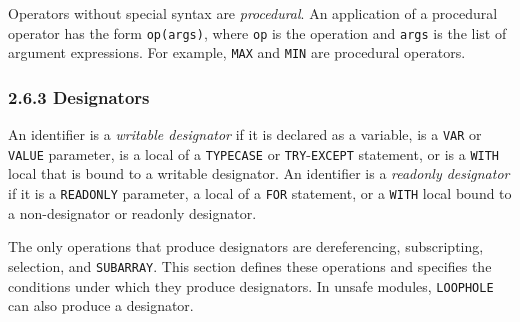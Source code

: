 \documentclass[10pt]{article}
\begin{document}
Operators without special syntax are \emph{procedural}.  An application of a
procedural operator has the form \verb|op(args)|, where \verb|op| is the
operation and \verb|args| is the list of argument expressions.  For example,
\verb|MAX| and \verb|MIN| are procedural operators.

\subsubsection*{2.6.3 Designators}

An identifier is a \emph{writable designator} if it is declared as a variable,
is a \verb|VAR| or \verb|VALUE| parameter, is a local of a \verb|TYPECASE| or
\verb|TRY|-\verb|EXCEPT| statement, or is a \verb|WITH| local that is bound to a
writable designator.  An identifier is a \emph{readonly designator} if it is a
\verb|READONLY| parameter, a local of a \verb|FOR| statement, or a \verb|WITH|
local bound to a non-designator or readonly designator.

The only operations that produce designators are dereferencing, subscripting,
selection, and \verb|SUBARRAY|.  This section defines these operations and
specifies the conditions under which they produce designators.  In unsafe
modules, \verb|LOOPHOLE| can also produce a designator.
\end{document}
